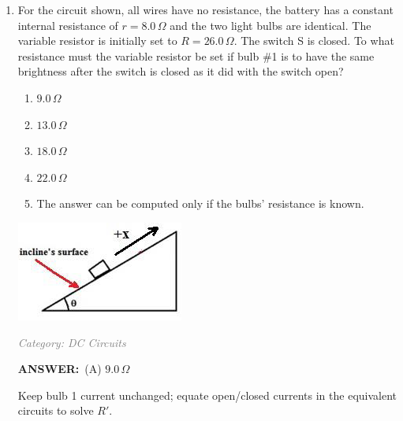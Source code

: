 \documentclass[12pt, a4paper]{article}
\makeatletter
\newcommand{\finalanswer}[1]{\textbf{ANSWER:}~#1}
\newif\if@categoryprinted
\newcommand{\category}[1]{\if@categoryprinted\relax\else\textit{\textcolor{gray}{Category: #1}}\global\@categoryprintedtrue\fi}
\makeatother
\begin{document}
\begin{CJK*}{UTF8}{gbsn}
\begin{enumerate}[itemsep=1.0em, topsep=0.6em]
\item \label{prob:22}
\noindent\begin{minipage}[t]{0.6\linewidth}
\vspace{0pt}
For the circuit shown, all wires have no resistance, the battery has a constant internal resistance of $r = 8.0\,\Omega$ and the two light bulbs are identical. The variable resistor is initially set to $R = 26.0\,\Omega$. The switch S is closed. To what resistance must the variable resistor be set if bulb \#1 is to have the same brightness after the switch is closed as it did with the switch open?
\begin{enumerate}[label=(\Alph*)]
    \item $9.0\,\Omega$
    \item $13.0\,\Omega$
    \item $18.0\,\Omega$
    \item $22.0\,\Omega$
    \item The answer can be computed only if the bulbs’ resistance is known.
\end{enumerate}
\end{minipage}%
\hfill
\begin{minipage}[t]{0.32\linewidth}
\vspace{0pt}
\centering
\includegraphics[width=\linewidth]{Problem_23_Figure.png}
\end{minipage}

\category{DC Circuits}
\begin{answerbox}
\finalanswer{(A) $9.0\,\Omega$}
\end{answerbox}
\begin{insightbox}
Keep bulb 1 current unchanged; equate open/closed currents in the equivalent circuits to solve $R'$.
\end{insightbox}
\begin{solutionbox}


\end{solutionbox}
\end{enumerate}
\end{CJK*}
\end{document}
